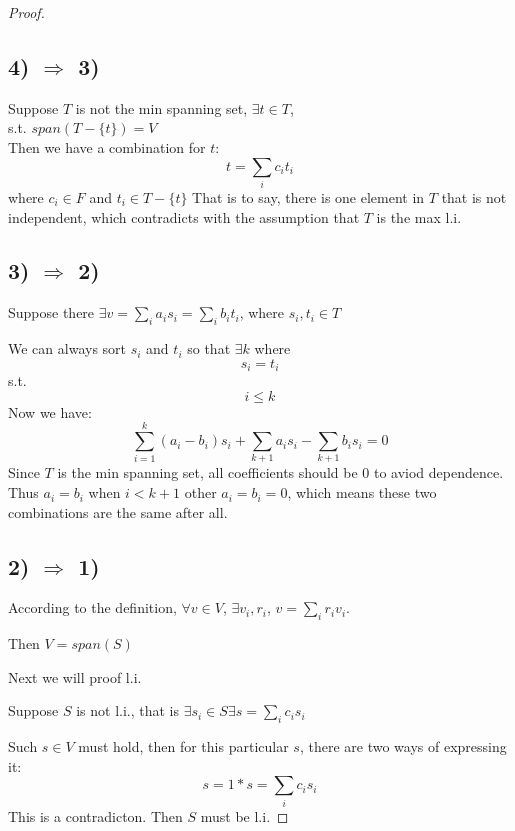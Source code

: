 \documentclass{article}
\begin{document}
\begin{description}
\begin{proof}
		\subsection*{4) $\Rightarrow$ 3)}
			Suppose $T$ is not the min spanning set, $\exists t \in T$, \\
			s.t. $span(T-\{t\}) = V$ \\
			Then we have a combination for $t$:
			$$ t = \sum_i c_i t_i$$
			where $c_i \in F$ and $t_i \in T-\{t\}$
			That is to say, there is one element in $T$ that is not independent, which contradicts with the assumption that $T$ is the max l.i.
		\subsection*{3) $\Rightarrow$ 2)}
			Suppose there $\exists v = \sum_i a_is_i = \sum_i b_it_i$,
			where $s_i, t_i \in T$ 
			\par We can always sort $s_i$ and $t_i$ so that $\exists k$ where $$s_i = t_i$$s.t.$$ i\leqslant k$$
			Now we have: 
			$$ \sum_{i=1}^k(a_i-b_i)s_i + \sum_{k+1}a_i s_i - \sum_{k+1}b_is_i = 0	$$
			Since $T$ is the min spanning set, all coefficients should be 0 to aviod dependence.
			Thus $a_i = b_i$ when $i<k+1$ other $a_i = b_i = 0$, which means these two combinations are the same after all.
		\subsection*{2) $\Rightarrow$ 1)}
			According to the definition, $\forall v \in V$, $\exists v_i, r_i$, $v = \sum_i r_iv_i$.
			\par Then $V = span(S)$
			\par Next we will proof l.i.
			\par Suppose $S$ is not l.i., that is $\exists s_i \in S \exists s = \sum_i c_is_i$
			\par Such $s\in V$ must hold, then for this particular $s$, there are two ways of expressing it:
				$$s = 1*s = \sum_i c_is_i$$
			This is a contradicton. 
			Then $S$ must be l.i.
	\end{proof}

	
\end{description}
\end{document}

